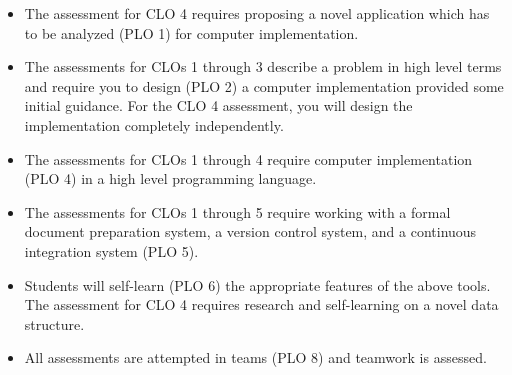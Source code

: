 \documentclass[a4paper]{article}
\begin{document}
\begin{itemize}
\item The assessment for CLO 4 requires proposing a novel application which has to be analyzed (PLO 1) for computer implementation.
\item The assessments for CLOs 1 through 3 describe a problem in high level terms and require you to design (PLO 2) a computer implementation provided some initial guidance. For the CLO 4 assessment, you will design the implementation completely independently.
\item The assessments for CLOs 1 through 4 require computer implementation (PLO 4) in a high level programming language.
\item The assessments for CLOs 1 through 5 require working with a formal document preparation system, a version control system, and a continuous integration system (PLO 5).
\item Students will self-learn (PLO 6) the appropriate features of the above tools. The assessment for CLO 4 requires research and self-learning on a novel data structure.
\item All assessments are attempted in teams (PLO 8) and teamwork is assessed.
\end{itemize}

\end{document}
